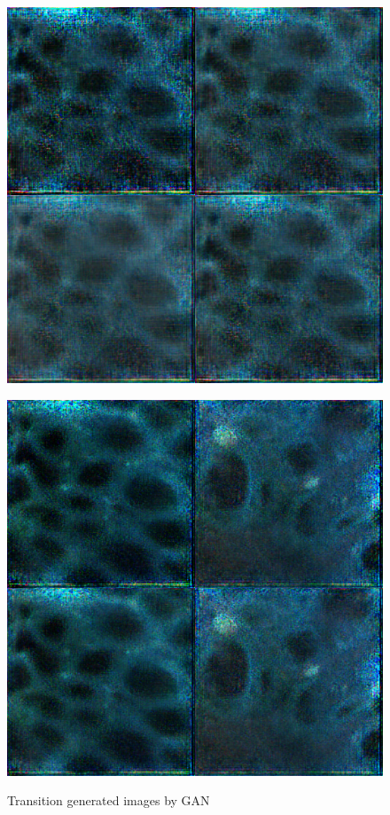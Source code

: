 \begin{figure}[H]
\begin{minipage}{0.24\columnwidth}
		\label{fig:}
	\end{minipage}
	\begin{minipage}{0.24\columnwidth}
		\centering
		\includegraphics[clip, width=\linewidth]{fig/generative_adversarial_nets/2004_0000}
		\label{fig:}
	\end{minipage}
	\begin{minipage}{0.24\columnwidth}
		\centering
		\includegraphics[clip, width=\linewidth]{fig/generative_adversarial_nets/3208_0000}
		\label{fig:}
	\end{minipage}
	
	\caption{Transition generated images by GAN}
	\label{fig:GANimage}
	
\end{figure}


